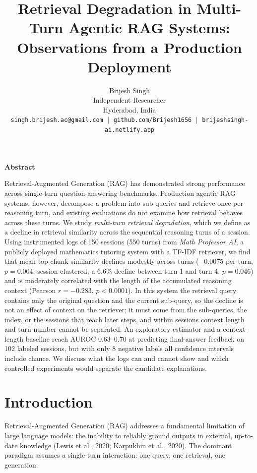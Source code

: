 \documentclass[11pt,a4paper]{article}
\title{\large\textbf{Retrieval Degradation in Multi-Turn Agentic RAG Systems:}\\[2pt]
       \large\textbf{Observations from a Production Deployment}}
\author{Brijesh Singh\\[3pt]
  \small Independent Researcher\\
  \small Hyderabad, India\\[2pt]
  \small \texttt{singh.brijesh.ac@gmail.com} $\;|\;$
         \texttt{github.com/Brijesh1656} $\;|\;$
         \texttt{brijeshsingh-ai.netlify.app}}
\date{}
\begin{document}
\maketitle
\thispagestyle{firstpage}

\begin{center}\textbf{Abstract}\end{center}
Retrieval-Augmented Generation (RAG) has demonstrated strong performance across single-turn
question-answering benchmarks. Production agentic RAG systems, however, decompose a problem into
sub-queries and retrieve once per reasoning turn, and existing evaluations do not examine how retrieval
behaves across these turns. We study \textit{multi-turn retrieval degradation}, which we define as a decline in
retrieval similarity across the sequential reasoning turns of a session. Using instrumented logs of 150
sessions (550 turns) from \textit{Math Professor AI}, a publicly deployed mathematics tutoring system with a
TF-IDF retriever, we find that mean top-chunk similarity declines modestly across turns ($-0.0075$ per turn,
$p = 0.004$, session-clustered; a 6.6\% decline between turn 1 and turn 4, $p = 0.046$) and is moderately
correlated with the length of the accumulated reasoning context (Pearson $r = -0.283$, $p < 0.0001$). In this
system the retrieval query contains only the original question and the current sub-query, so the decline is
not an effect of context on the retriever; it must come from the sub-queries, the index, or the sessions that
reach later steps, and within sessions context length and turn number cannot be separated. An exploratory
estimator and a context-length baseline reach AUROC 0.63--0.70 at predicting final-answer feedback on 102
labeled sessions, but with only 8 negative labels all confidence intervals include chance. We discuss what
the logs can and cannot show and which controlled experiments would separate the candidate explanations.

\bigskip

\section{Introduction}

Retrieval-Augmented Generation (RAG) addresses a fundamental limitation of large language models: the
inability to reliably ground outputs in external, up-to-date knowledge (Lewis et al., 2020; Karpukhin et al.,
2020). The dominant paradigm assumes a single-turn interaction: one query, one retrieval, one generation.
\end{document}

